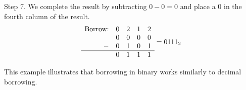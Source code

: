 Step 7. We complete the result by subtracting \(0-0=0\) and place a 0 in the fourth column of the result.
\[
\begin{array}{rcccc}
    \text{Borrow:} & 0 & 2 & 1 & 2 \\ %
                   & 0 & 0 & 0 & 0 \\ %
                 - & 0 & 1 & 0 & 1 \\ %
  \hline
                   & 0 & 1 & 1 & 1 \\ %
\end{array}= 0111_2
\]

This example illustrates that borrowing in binary works similarly to decimal borrowing.


